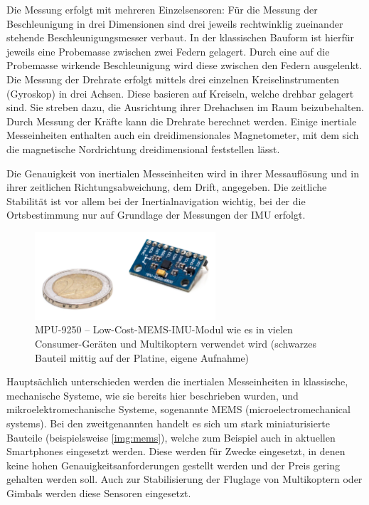 \documentclass[a4paper,12pt,bibliography=totoc, listof=totoc,titlepage,pointlessnumbers]{scrreprt}
\begin{document}
Die Messung erfolgt mit mehreren Einzelsensoren: Für die Messung der Beschleunigung in drei Dimensionen sind drei jeweils rechtwinklig zueinander stehende Beschleunigungsmesser verbaut. In der klassischen Bauform ist hierfür jeweils eine Probemasse zwischen zwei Federn gelagert. Durch eine auf die Probemasse wirkende Beschleunigung wird diese zwischen den Federn ausgelenkt. Die Messung der Drehrate erfolgt mittels drei einzelnen Kreiselinstrumenten (Gyroskop) in drei Achsen. Diese basieren auf Kreiseln, welche drehbar gelagert sind. Sie streben dazu, die Ausrichtung ihrer Drehachsen im Raum beizubehalten. Durch Messung der Kräfte kann die Drehrate berechnet werden. Einige inertiale Messeinheiten enthalten auch ein dreidimensionales Magnetometer, mit dem sich die magnetische Nordrichtung dreidimensional feststellen lässt. \citep[S. 10]{willemsen}

Die Genauigkeit von inertialen Messeinheiten wird in ihrer Messauflösung und in ihrer zeitlichen Richtungsabweichung, dem Drift, angegeben. Die zeitliche Stabilität ist vor allem bei der Inertialnavigation wichtig, bei der die Ortsbestimmung nur auf Grundlage der Messungen der IMU erfolgt.

\begin{figure}
 \centering
 \includegraphics[width=0.6\textwidth]{./img/mems.jpg}
 \caption{MPU-9250 -- Low-Cost-MEMS-IMU-Modul wie es in vielen Consumer-Geräten und Multikoptern verwendet wird (schwarzes Bauteil mittig auf der Platine, eigene Aufnahme)}
 \label{img:mems}
\end{figure}

Hauptsächlich unterschieden werden die inertialen Messeinheiten in klassische, mechanische Systeme, wie sie bereits hier beschrieben wurden, und mikroelektromechanische Systeme, sogenannte MEMS (microelectromechanical systems). Bei den zweitgenannten handelt es sich um stark miniaturisierte Bauteile (beispielsweise \autoref{img:mems}), welche zum Beispiel auch in aktuellen Smartphones eingesetzt werden. Diese werden für Zwecke eingesetzt, in denen keine hohen Genauigkeitsanforderungen gestellt werden und der Preis gering gehalten werden soll. Auch zur Stabilisierung der Fluglage von Multikoptern oder Gimbals werden diese Sensoren eingesetzt. \citep[S. 9f]{willemsen}
\end{document}
